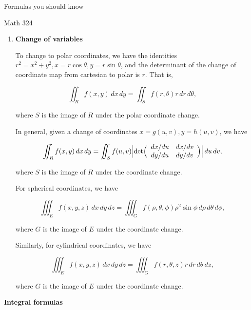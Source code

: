 \documentclass[11 pt]{report}
\begin{document}
\begin{Large} Formulas you should know \end{Large}

\vspace{5pt}

\large{Math 324} 

\begin{enumerate} \item[] \textbf{Change of variables}

To change to polar coordinates, we have the identities $r^2 = x^2+y^2, x = r \cos \theta, y = r \sin \theta$, and the determinant of the change of coordinate map from cartesian to polar is $r$. That is, 

$$\iint_R f(x,y) \, dx\, dy = \iint_S f(r, \theta) r \, dr \, d\theta,$$

where $S$ is the image of $R$ under the polar coordinate change. 

In general, given a change of coordinates $x = g(u,v), y = h(u,v)$, we have

$$\iint_R f(x,y) \, dx \, dy = \iint_S f(u,v) \Bigl| \text{det} \Bigl( \begin{array}{cc} dx/du & dx/dv \\ dy/du & dy/dv \end{array} \Bigr) \Bigr| \, du \, dv,$$

where $S$ is the image of $R$ under the coordinate change. 

For spherical coordinates, we have

$$\iiint_E f(x,y,z) \, dx \, dy \, dz = \iiint_G f(\rho, \theta, \phi) \rho^2 \sin \phi \, d\rho\, d\theta \, d\phi,$$

where $G$ is the image of $E$ under the coordinate change. 

\vspace{10pt}

Similarly, for cylindrical coordinates, we have

$$\iiint_E f(x,y,z)  \, dx \, dy \, dz = \iiint_G f(r, \theta, z) r \, dr \, d \theta \, dz,$$

where $G$ is the image of $E$ under the coordinate change. 
\end{enumerate}

\textbf{Integral formulas}
\end{document}
